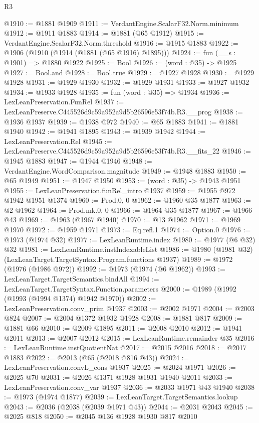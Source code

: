 \begin{lexlean}{R3}
\begin{coremodule}
@1910 := @1881 @1909
@1911 := VerdantEngine.ScalarF32.Norm.minimum
@1912 := @1911 @1883
@1914 := @1881 (@65 @1912)
@1915 := VerdantEngine.ScalarF32.Norm.threshold
@1916 := @1915 @1883
@1922 := @1906 (@1910 (@1914 (@1881 (@65 @1916) @1895)))
@1924 := fun (__s : @1901) => @1880 @1922
@1925 := Bool
@1926 := (word : @35) -> @1925
@1927 := Bool.and
@1928 := Bool.true
@1929 := @1927 @1928
@1930 := @1929 @1928
@1931 := @1929 @1930
@1932 := @1929 @1931
@1933 := @1927 @1932
@1934 := @1933 @1928
@1935 := fun (word : @35) => @1934
@1936 := LexLeanPreservation.FunRel
@1937 := LexLeanPreserve.C445526d9c59a952a9d5b26596e53f74b.R3.__prog
@1938 := @1936 @1937
@1939 := @1938 @972
@1940 := @65 @1883
@1941 := @1881 @1940
@1942 := @1941 @1895
@1943 := @1939 @1942
@1944 := LexLeanPreservation.Rel
@1945 := LexLeanPreserve.C445526d9c59a952a9d5b26596e53f74b.R3.__fits_22
@1946 := @1945 @1883
@1947 := @1944 @1946
@1948 := VerdantEngine.WordComparison.magnitude
@1949 := @1948 @1883
@1950 := @65 @1949
@1951 := @1947 @1950
@1953 := (word : @35) -> @1943 @1951
@1955 := LexLeanPreservation.funRel_intro @1937
@1959 := @1955 @972 @1942 @1951 @1374
@1960 := Prod.{0, 0}
@1962 := @1960 @35 @1877
@1963 := @2 @1962
@1964 := Prod.mk.{0, 0}
@1966 := @1964 @35 @1877
@1967 := @1966 @43
@1969 := @1963 (@1967 @1940)
@1970 := @13 @1962
@1971 := @1969 @1970
@1972 := @1959 @1971
@1973 := Eq.refl.{1}
@1974 := Option.{0}
@1976 := @1973 (@1974 @32)
@1977 := LexLeanRuntime.index
@1980 := @1977 (@6 @32) @32
@1981 := LexLeanRuntime.instIndexableList
@1986 := @1980 (@1981 @32) (LexLeanTarget.TargetSyntax.Program.functions @1937)
@1989 := @1972 (@1976 (@1986 @972))
@1992 := @1973 (@1974 (@6 @1962))
@1993 := LexLeanTarget.TargetSemantics.bindAll
@1994 := LexLeanTarget.TargetSyntax.Function.parameters
@2000 := @1989 (@1992 (@1993 (@1994 @1374) @1942 @1970))
@2002 := LexLeanPreservation.conv_prim @1937
@2003 := @2002 @1971
@2004 := @2003 @824
@2007 := @2004 @1372 @1932 @1928
@2008 := @1881 @817
@2009 := @1881 @66
@2010 := @2009 @1895
@2011 := @2008 @2010
@2012 := @1941 @2011
@2013 := @2007 @2012
@2015 := LexLeanRuntime.remainder @35
@2016 := LexLeanRuntime.instQuotientNat
@2017 := @2015 @2016
@2018 := @2017 @1883
@2022 := @2013 (@65 (@2018 @816 @43))
@2024 := LexLeanPreservation.convL_cons @1937
@2025 := @2024 @1971
@2026 := @2025 @70
@2031 := @2026 @1371 @1928 @1931 @1940 @2011
@2033 := LexLeanPreservation.conv_var @1937
@2036 := @2033 @1971 @43 @1940
@2038 := @1973 (@1974 @1877)
@2039 := LexLeanTarget.TargetSemantics.lookup
@2043 := @2036 (@2038 (@2039 @1971 @43))
@2044 := @2031 @2043
@2045 := @2025 @818
@2050 := @2045 @136 @1928 @1930 @817 @2010

\end{coremodule}
\end{lexlean}
